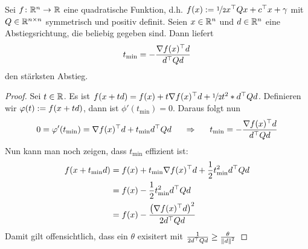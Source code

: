 \begin{beispiel}
	Sei $\abb{f}{\R^n}{\R}$ eine quadratische Funktion, d.h. $f(x) \defeq \lfrac{1}{2} \trans{x}Qx + \trans{c}x + \gamma$ mit $Q \in \mathbb{R}^{n \times n}$ symmetrisch und positiv definit. Seien $x \in \mathbb{R}^n$ und $d \in \mathbb{R}^n$ eine Abstiegsrichtung, die beliebig gegeben sind. Dann liefert 
	\begin{equation*}
		t_{\min} = - \frac{\nabla f(x)^{\top} d}{d^{\top} Q d}
	\end{equation*}
	den stärksten Abstieg.
\end{beispiel}
\begin{proof}
	Sei $t \in \mathbb{R}$. Es ist $f(x + td) = f(x) + t \nabla \trans{f(x)} d + \lfrac{1}{2} t^2 * \trans{d} Q d$. Definieren wir $\varphi(t) \mathrel{:=} f(x + td)$, dann ist $\phi'(t_{\min}) = 0$. Daraus folgt nun
	\begin{equation*}
		0 = \varphi'(t_{\min}) = \nabla f(x)^{\top} d + t_{\min} d^{\top} Q d \quad \enskip \Rightarrow \enskip \quad t_{\min} = - \frac{\nabla f(x)^{\top} d}{d^{\top} Q d}
	\end{equation*}
	Nun kann man noch zeigen, dass $t_{\min}$ effizient ist:
	\begin{equation*}
		\begin{aligned}
		f(x + t_{\min} d) &= f(x) + t_{\min} \nabla f(x)^{\top} d + \frac{1}{2} t_{\min}^2 d^{\top} Q d \\
		&= f(x) - \frac{1}{2} t_{\min}^2 d^{\top} Q d \\
		&= f(x) - \frac{\left( \nabla f(x)^{\top} d \right)^2}{2 d^{\top} Q d}
		\end{aligned}
	\end{equation*}
	Damit gilt offensichtlich, dass ein $\theta$ exisitert mit $\frac{1}{2 d^{\top} Q d} \ge \frac{\theta}{\left\lVert d \right\rVert^2}$
\end{proof}